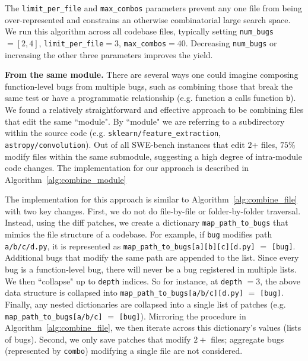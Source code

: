 The \texttt{limit\_per\_file} and \texttt{max\_combos} parameters prevent any one file from being over-represented and constrains an otherwise combinatorial large search space.
We run this algorithm across all codebase files, typically setting \texttt{num\_bugs}$=[2,4]$, \texttt{limit\_per\_file}$=3$, \texttt{max\_combos}$=40$.
Decreasing \texttt{num\_bugs} or increasing the other three parameters improves the yield.

\textbf{From the same module.} There are several ways one could imagine composing function-level bugs from multiple bugs, such as combining those that break the same test or have a programmatic relationship (e.g. function \texttt{a} calls function \texttt{b}).
We found a relatively straightforward and effective approach to be combining files that edit the same ``module".
By ``module" we are referring to a subdirectory within the source code (e.g. \texttt{sklearn/feature\_extraction}, \texttt{astropy/convolution}).
Out of all SWE-bench instances that edit $2$+ files, $75$\% modify files within the same submodule, suggesting a high degree of intra-module code changes.
The implementation for our approach is described in Algorithm~\ref{alg:combine_module}



The implementation for this approach is similar to Algorithm~\ref{alg:combine_file} with two key changes.
First, we do not do file-by-file or folder-by-folder traversal.
Instead, using the diff patches, we create a dictionary \texttt{map\_path\_to\_bugs} that mimics the file structure of a codebase.
For example, if \texttt{bug} modifies path \texttt{a/b/c/d.py}, it is represented as \texttt{map\_path\_to\_bugs[a][b][c][d.py]} $=$ \texttt{[bug]}.
Additional bugs that modify the same path are appended to the list.
Since every bug is a function-level bug, there will never be a bug registered in multiple lists.
We then ``collapse" up to \texttt{depth} indices.
So for instance, at \texttt{depth} $=3$, the above data structure is collapsed into \texttt{map\_path\_to\_bugs[a/b/c][d.py]} $=$ \texttt{[bug]}.
Finally, any nested dictionaries are collapsed into a single list of patches (e.g. \texttt{map\_path\_to\_bugs[a/b/c]} $=$ \texttt{[bug]}).
Mirroring the procedure in Algorithm~\ref{alg:combine_file}, we then iterate across this dictionary's values (lists of bugs).
Second, we only save patches that modify $2+$ files; aggregate bugs (represented by \texttt{combo}) modifying a single file are not considered.

